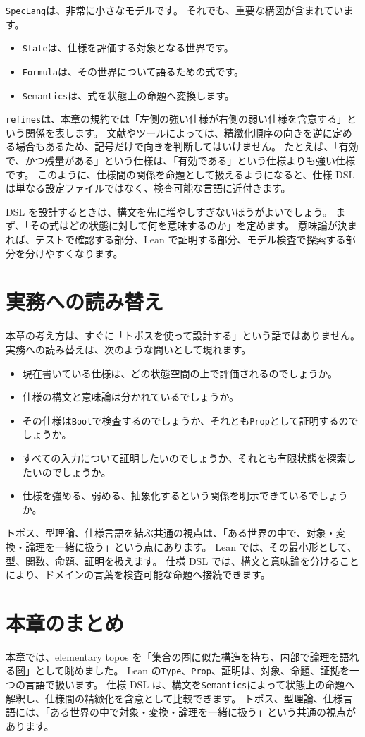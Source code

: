 \texttt{SpecLang}は、非常に小さなモデルです。
それでも、重要な構図が含まれています。

\begin{itemize}
  \item \texttt{State}は、仕様を評価する対象となる世界です。
  \item \texttt{Formula}は、その世界について語るための式です。
  \item \texttt{Semantics}は、式を状態上の命題へ変換します。
\end{itemize}

\texttt{refines}は、本章の規約では「左側の強い仕様が右側の弱い仕様を含意する」という関係を表します。
文献やツールによっては、精緻化順序の向きを逆に定める場合もあるため、記号だけで向きを判断してはいけません。
たとえば、「有効で、かつ残量がある」という仕様は、「有効である」という仕様よりも強い仕様です。
このように、仕様間の関係を命題として扱えるようになると、仕様 DSL は単なる設定ファイルではなく、検査可能な言語に近付きます。

DSL を設計するときは、構文を先に増やしすぎないほうがよいでしょう。
まず、「その式はどの状態に対して何を意味するのか」を定めます。
意味論が決まれば、テストで確認する部分、Lean で証明する部分、モデル検査で探索する部分を分けやすくなります。

\section{実務への読み替え}

本章の考え方は、すぐに「トポスを使って設計する」という話ではありません。
実務への読み替えは、次のような問いとして現れます。

\begin{itemize}
  \item 現在書いている仕様は、どの状態空間の上で評価されるのでしょうか。
  \item 仕様の構文と意味論は分かれているでしょうか。
  \item その仕様は\texttt{Bool}で検査するのでしょうか、それとも\texttt{Prop}として証明するのでしょうか。
  \item すべての入力について証明したいのでしょうか、それとも有限状態を探索したいのでしょうか。
  \item 仕様を強める、弱める、抽象化するという関係を明示できているでしょうか。
\end{itemize}

トポス、型理論、仕様言語を結ぶ共通の視点は、「ある世界の中で、対象・変換・論理を一緒に扱う」という点にあります。
Lean では、その最小形として、型、関数、命題、証明を扱えます。
仕様 DSL では、構文と意味論を分けることにより、ドメインの言葉を検査可能な命題へ接続できます。

\section{本章のまとめ}

本章では、elementary topos を「集合の圏に似た構造を持ち、内部で論理を語れる圏」として眺めました。
Lean の\texttt{Type}、\texttt{Prop}、証明は、対象、命題、証拠を一つの言語で扱います。
仕様 DSL は、構文を\texttt{Semantics}によって状態上の命題へ解釈し、仕様間の精緻化を含意として比較できます。
トポス、型理論、仕様言語には、「ある世界の中で対象・変換・論理を一緒に扱う」という共通の視点があります。
